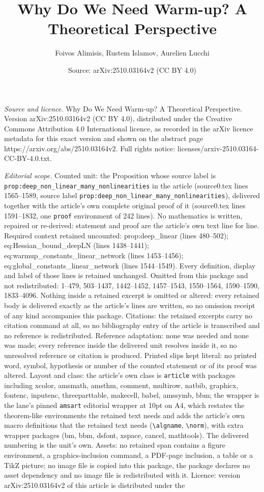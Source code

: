 \documentclass[10pt,a4paper]{amsart}
\title[Why Do We Need Warm-up? A Theoretical Perspective]{Why Do We Need Warm-up? A Theoretical Perspective}
\author{Foivos Alimisis, Rustem Islamov, Aurelien Lucchi}
\date{Source: arXiv:2510.03164v2 (CC BY 4.0)}
\begin{document}
\maketitle

\noindent\emph{Source and licence.} Why Do We Need Warm-up? A Theoretical Perspective. Version arXiv:2510.03164v2 (CC BY 4.0), distributed under the Creative Commons Attribution 4.0 International licence, as recorded in the arXiv licence metadata for this exact version and shown on the abstract page https://arxiv.org/abs/2510.03164v2. Full rights notice: licenses/arxiv-2510.03164-CC-BY-4.0.txt.\par\smallskip

\noindent\textit{Editorial scope.} Counted unit: the Proposition whose source label is \texttt{prop:deep\_non\_linear\_many\_nonlinearities} in the article (source0.tex lines 1565--1589, source label \texttt{prop:deep\_non\_linear\_many\_nonlinearities}), delivered together with the article's own complete original proof of it (source0.tex lines 1591--1832, one \texttt{proof} environment of 242 lines). No mathematics is written, repaired or re-derived: statement and proof are the article's own text line for line. Required context retained uncounted: prop:deep\_linear (lines 480--502); eq:Hessian\_bound\_deepLN (lines 1438--1441); eq:warmup\_constants\_linear\_network (lines 1453--1456); eq:global\_constants\_linear\_network (lines 1544--1549). Every definition, display and label of those lines is retained unchanged. Omitted from this package and not redistributed: 1--479, 503--1437, 1442--1452, 1457--1543, 1550--1564, 1590--1590, 1833--4096. Nothing inside a retained excerpt is omitted or altered: every retained body is delivered exactly as the article's lines are written, so no omission receipt of any kind accompanies this package. Citations: the retained excerpts carry no citation command at all, so no bibliography entry of the article is transcribed and no reference is redistributed. Reference adaptation: none was needed and none was made; every reference inside the delivered unit resolves inside it, so no unresolved reference or citation is produced. Printed slips kept literal: no printed word, symbol, hypothesis or number of the counted statement or of its proof was altered. Layout and class: the article's own class is \texttt{article} with packages including xcolor, amsmath, amsthm, comment, multirow, natbib, graphicx, fontenc, inputenc, threeparttable, makecell, babel, amssymb, bbm; the wrapper is the lane's pinned \texttt{amsart} editorial wrapper at 10pt on A4, which restates the theorem-like environments the retained text needs and adds the article's own macro definitions that the retained text needs (\texttt{\textbackslash algname}, \texttt{\textbackslash norm}), with extra wrapper packages (bm, bbm, dsfont, xspace, cancel, mathtools). The delivered numbering is the unit's own. Assets: no retained span contains a figure environment, a graphics-inclusion command, a PDF-page inclusion, a table or a TikZ picture; no image file is copied into this package, the package declares no asset dependency and no image file is redistributed with it. Licence: version arXiv:2510.03164v2 of this article is distributed under the 
\end{document}
